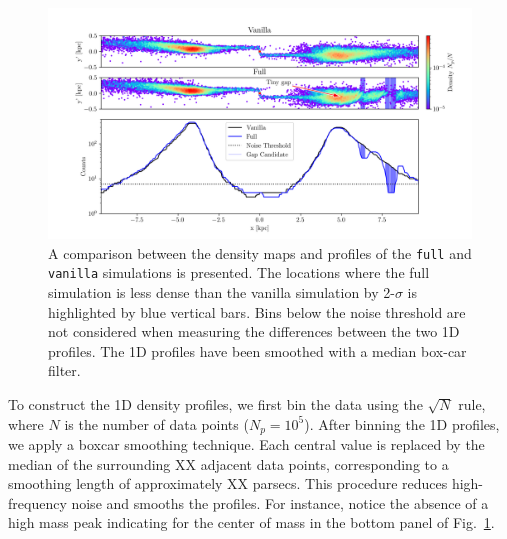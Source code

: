 \documentclass[draft]{aa}
\begin{document}
      \begin{figure}
        \centering
        \includegraphics[width=\linewidth, trim=20 0 15 0]{monte-carlo-009-pouliasis2017pii-GCNBody-2000-milisigma-5-noisefactor-20-boxcarindexlength-shifted-0.png}
        \caption{A comparison between the density maps and profiles of the \texttt{full} and \texttt{vanilla} simulations is presented. The locations where the full simulation is less dense than the vanilla simulation by 2-$\sigma$ is highlighted by blue vertical bars. Bins below the noise threshold are not considered when measuring the differences between the two 1D profiles. The 1D profiles have been smoothed with a median box-car filter.}
        \label{fig:profiles}
        \end{figure}

      To construct the 1D density profiles, we first bin the data using the $\sqrt{N}$ rule, where $N$ is the number of data points ($N_p = 10^5$). After binning the 1D profiles, we apply a boxcar smoothing technique. Each central value is replaced by the median of the surrounding XX adjacent data points, corresponding to a smoothing length of approximately XX parsecs. This procedure reduces high-frequency noise and smooths the profiles. For instance, notice the absence of a high mass peak indicating for the center of mass in the bottom panel of Fig.~\ref{fig:profiles}.
\end{document}
